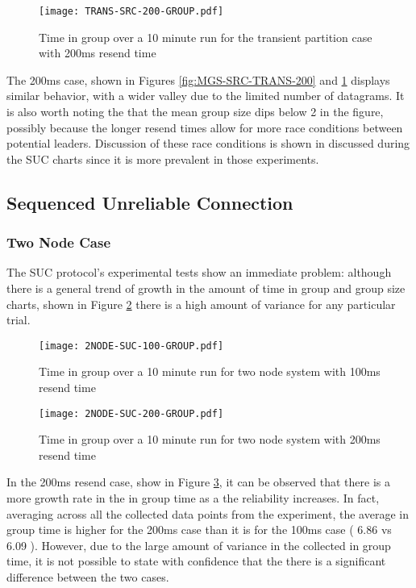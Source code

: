 \begin{figure}[!h]
\centering
\texttt{[image: TRANS-SRC-200-GROUP.pdf]}
\caption{Time in group over a 10 minute run for the transient partition case with 200ms resend time}
\label{fig:IGT-SRC-TRANS-200}
\end{figure}

The 200ms case, shown in Figures \ref{fig:MGS-SRC-TRANS-200} and \ref{fig:IGT-SRC-TRANS-200} displays similar behavior, with a wider valley due to the
limited number of datagrams. It is also worth noting the that the mean group
size dips below 2 in the figure, possibly because the longer resend times allow
for more race conditions between potential leaders. Discussion of these race
conditions is shown in discussed during the SUC charts since it is more prevalent
in those experiments.

\subsection{Sequenced Unreliable Connection}

\subsubsection{Two Node Case}

The SUC protocol's experimental tests show an immediate problem: although there
is a general trend of growth in the amount of time in group and group size
charts, shown in Figure \ref{fig:IGT-SUC-2NODE-100}
there is a high amount of variance for any particular trial.

\begin{figure}[!h]
\centering
\texttt{[image: 2NODE-SUC-100-GROUP.pdf]}
\caption{Time in group over a 10 minute run for two node system with 100ms resend time}
\label{fig:IGT-SUC-2NODE-100}
\end{figure}

\begin{figure}[!h]
\centering
\texttt{[image: 2NODE-SUC-200-GROUP.pdf]}
\caption{Time in group over a 10 minute run for two node system with 200ms resend time}
\label{fig:IGT-SUC-2NODE-200}
\end{figure}

In the 200ms resend case, show in Figure \ref{fig:IGT-SUC-2NODE-200}, it can be 
observed that there is a more growth rate in the in group time as a the
reliability increases. In fact, averaging across all the collected data points
from the experiment, the average in group time is higher for the 200ms case
than it is for the 100ms case ( 6.86 vs 6.09 ). However, due to the large amount
of variance in the collected in group time, it is not possible to state with
confidence that the there is a significant difference between the two cases.

